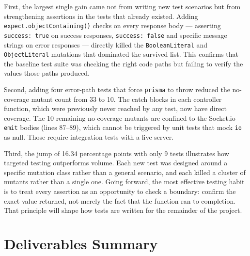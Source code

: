 \documentclass[12pt, a4paper]{article}
\begin{document}
First, the largest single gain came not from writing new test scenarios but from strengthening assertions in the tests that already existed. Adding \texttt{expect.objectContaining()} checks on every response body --- asserting \texttt{success: true} on success responses, \texttt{success: false} and specific message strings on error responses --- directly killed the \texttt{BooleanLiteral} and \texttt{ObjectLiteral} mutations that dominated the survived list. This confirms that the baseline test suite was checking the right code paths but failing to verify the values those paths produced.

Second, adding four error-path tests that force \texttt{prisma} to throw reduced the no-coverage mutant count from 33 to 10. The catch blocks in each controller function, which were previously never reached by any test, now have direct coverage. The 10 remaining no-coverage mutants are confined to the Socket.io \texttt{emit} bodies (lines 87--89), which cannot be triggered by unit tests that mock \texttt{io} as null. Those require integration tests with a live server.

Third, the jump of 16.34 percentage points with only 9 tests illustrates how targeted testing outperforms volume. Each new test was designed around a specific mutation class rather than a general scenario, and each killed a cluster of mutants rather than a single one. Going forward, the most effective testing habit is to treat every assertion as an opportunity to check a boundary: confirm the exact value returned, not merely the fact that the function ran to completion. That principle will shape how tests are written for the remainder of the project.

\section{Deliverables Summary}
\end{document}

